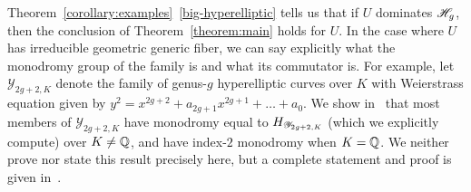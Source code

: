\begin{remark} \label{remark:}
	Theorem~\ref{corollary:examples}~\ref{big-hyperelliptic} tells us that if $U$ dominates $\mathscr H_{g}$, then the conclusion of Theorem~\ref{theorem:main} holds for $U$. In the case where $U$ has irreducible geometric generic fiber, we can say explicitly what the monodromy group of the family is and what its commutator is. For example, let $\mathscr{Y}_{2g+2,K}$ denote the family of genus-$g$ hyperelliptic curves over $K$ with Weierstrass equation given by $y^2 = x^{2g+2} + a_{2g+1}x^{2g+1} + \dots + a_0$. We show in~\cite[Theorem 1.2]{landesman-swaminathan-tao-xu:hyperelliptic-curves} that most members of $\mathscr{Y}_{2g+2, K}$ have monodromy equal to $H_{\mathscr Y_{2g+2,K}}$ (which we explicitly compute) over $K \neq \mathbb Q$, and have index-$2$ monodromy when $K = \mathbb Q$. We neither prove nor state this result precisely here, but a complete statement and proof is given in~\cite{landesman-swaminathan-tao-xu:hyperelliptic-curves}.
\end{remark}
